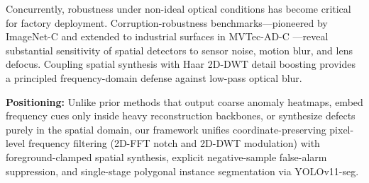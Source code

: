 Concurrently, robustness under non-ideal optical conditions has become critical for factory deployment. Corruption-robustness benchmarks---pioneered by ImageNet-C \cite{hendrycks2019robustness} and extended to industrial surfaces in MVTec-AD-C \cite{chen2023mvtecadc}---reveal substantial sensitivity of spatial detectors to sensor noise, motion blur, and lens defocus. Coupling spatial synthesis with Haar 2D-DWT detail boosting provides a principled frequency-domain defense against low-pass optical blur.

\textbf{Positioning:} Unlike prior methods that output coarse anomaly heatmaps, embed frequency cues only inside heavy reconstruction backbones, or synthesize defects purely in the spatial domain, our framework unifies coordinate-preserving pixel-level frequency filtering (2D-FFT notch and 2D-DWT modulation) with foreground-clamped spatial synthesis, explicit negative-sample false-alarm suppression, and single-stage polygonal instance segmentation via YOLOv11-seg.

